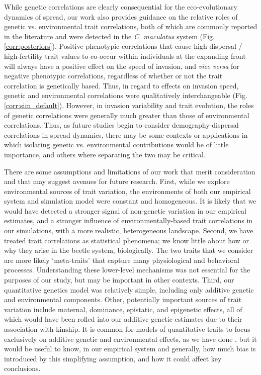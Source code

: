\documentclass[11pt]{article}
\begin{document}
While genetic correlations are clearly consequential for the eco-evolutionary dynamics of spread, our work also provides guidance on the relative roles of genetic vs. environmental trait correlations, both of which are commonly reported in the literature and were detected in the \textit{C. maculatus} system (Fig. \ref{corr:posteriors}).
Positive phenotypic correlations that cause high-dispersal / high-fertility trait values to co-occur within individuals at the expanding front will always have a positive effect on the speed of invasion, and \textit{vice versa} for negative phenotypic correlations, regardless of whether or not the trait correlation is genetically based.
Thus, in regard to effects on invasion speed, genetic and environmental correlations were qualitatively interchangeable (Fig. \ref{corr:sim_default}).
However, in invasion variability and trait evolution, the roles of genetic correlations were generally much greater than those of environmental correlations.
Thus, as future studies begin to consider demography-dispersal correlations in spread dynamics, there may be some contexts or applications in which isolating genetic vs. environmental contributions would be of little importance, and others where separating the two may be critical.

There are some assumptions and limitations of our work that merit consideration and that may suggest avenues for future research.
First, while we explore environmental sources of trait variation, the environments of both our empirical system and simulation model were constant and homogeneous.
It is likely that we would have detected a stronger signal of non-genetic variation in our empirical estimates, and  a stronger influence of environmentally-based trait correlations in our simulations, with a more realistic, heterogeneous landscape.
Second, we have treated trait correlations as statistical phenomena; we know little about how or why they arise in the beetle system, biologically.
The two traits that we consider are more likely `meta-traits' that capture many physiological and behavioral processes.
Understanding these lower-level mechanisms was not essential for the purposes of our study, but may be important in other contexts.
Third, our quantitative genetics model was relatively simple, including only additive genetic and environmental components.
Other, potentially important sources of trait variation include maternal, dominance, epistatic, and epigenetic effects, all of which would have been rolled into our additive genetic estimates due to their association with kinship.
It is common for models of quantitative traits to focus exclusively on additive genetic and environmental effects, as we have done \citep{wilson_ecologists_2010}, but it would be useful to know, in our empirical system and generally, how much bias is introduced by this simplifying assumption, and how it could affect key conclusions.
\end{document}

